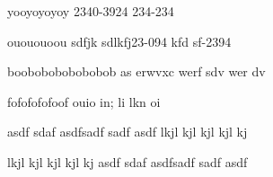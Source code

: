 \documentclass[
	14pt,
	a4paper,
	]
	{scrartcl}
\begin{document}
\shapk
{}
\setcounter{zad}{0}

\vfill
\z yooyoyoyoy
 \vfill
{} 2340-3924 234-234  \vfill

\vfill

\newpage


\shapk
{}
\setcounter{zad}{0}

\vfill
\z ouououoou
 \vfill
\z sdfjk   sdlkfj23-094 kfd sf-2394
 \vfill

\vfill

\newpage


\shapk
{}
\setcounter{zad}{0}

\vfill
\z boobobobobobobob
 \vfill
\z as erwvxc werf sdv wer dv 
 \vfill

\vfill

\newpage


\shapk
{}
\setcounter{zad}{0}

\vfill
\z fofofofofoof
 \vfill
\z ouio in; li lkn oi 
 \vfill

\vfill

\newpage


\shapk
{}
\setcounter{zad}{0}

\vfill
\z asdf sdaf asdfsadf sadf asdf
 \vfill
\z lkjl kjl kjl kjl kj
 \vfill

\vfill

\newpage


\shapk
{}
\setcounter{zad}{0}

\vfill
\z lkjl kjl kjl kjl kj
 \vfill
\z asdf sdaf asdfsadf sadf asdf
 \vfill

\vfill

\newpage
\end{document}
